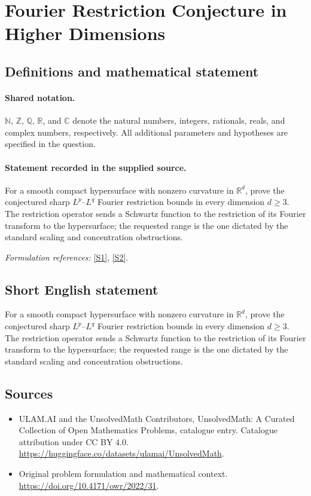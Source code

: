 \documentclass[11pt]{article}
\newcommand{\sref}[2]{\hyperlink{source:#1:#2}{[S#2]}}
\begin{document}
\section{Fourier Restriction Conjecture in Higher Dimensions}\label{statement}

\subsection{Definitions and mathematical statement}

\paragraph{Shared notation.}$\mathbb N$, $\mathbb Z$, $\mathbb Q$, $\mathbb R$, and $\mathbb C$ denote the natural numbers, integers, rationals, reals, and complex numbers, respectively. All additional parameters and hypotheses are specified in the question.


\paragraph{Statement recorded in the supplied source.}
For a smooth compact hypersurface with nonzero curvature in $\mathbb R^d$, prove the conjectured sharp $L^p$--$L^q$ Fourier restriction bounds in every dimension $d\geq3$. The restriction operator sends a Schwartz function to the restriction of its Fourier transform to the hypersurface; the requested range is the one dictated by the standard scaling and concentration obstructions.
\par\smallskip\textit{Formulation references:} \sref{statement}{1}, \sref{statement}{2}.
\subsection{Short English statement}
For a smooth compact hypersurface with nonzero curvature in $\mathbb R^d$, prove the conjectured sharp $L^p$--$L^q$ Fourier restriction bounds in every dimension $d\geq3$. The restriction operator sends a Schwartz function to the restriction of its Fourier transform to the hypersurface; the requested range is the one dictated by the standard scaling and concentration obstructions.
\subsection{Sources}
\begin{itemize}
\item[\hypertarget{source:statement:1}{S1}] ULAM.AI and the UnsolvedMath Contributors, UnsolvedMath: A Curated Collection of Open Mathematics Problems, catalogue entry. Catalogue attribution under CC BY 4.0.
\url{https://huggingface.co/datasets/ulamai/UnsolvedMath}.
\item[\hypertarget{source:statement:2}{S2}] Original problem formulation and mathematical context.
\url{https://doi.org/10.4171/owr/2022/31}.
\end{itemize}
\label{end:statement}
\end{document}
